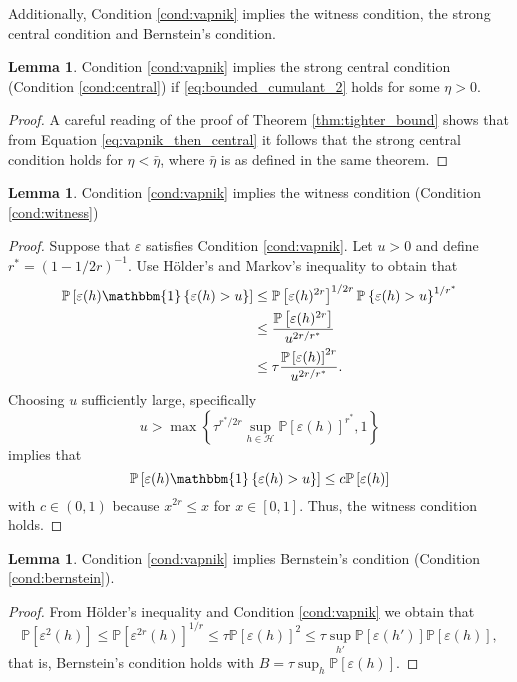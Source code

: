 \documentclass{uvamath}
\newcommand*{\calH}{\mathcal{H}}
\newcommand*{\prob}[2][]{\mathbb{P}_{#1}\left\{#2\right\}}
\newcommand*{\expv}[1]{\mathbb{P}\left[#1\right]}
\newcommand*{\indicator}[1]{\mathbbm{1}\left\{#1\right\}}
\newcommand*{\bracks}[1]{\left\{#1\right\}}
\theoremstyle{remark}
\theoremstyle{definition}
\theoremstyle{definition}
\theoremstyle{definition}
\theoremstyle{definition}
\newtheorem{lemma}[theorem]{Lemma}
\theoremstyle{definition}
\begin{document}
Additionally, Condition \ref{cond:vapnik} implies the witness
condition, the strong central condition and Bernstein's condition.

\begin{lemma}\label{lem:vapnik_then_central}
  Condition \ref{cond:vapnik} implies the strong central condition
  (Condition \ref{cond:central}) if \eqref{eq:bounded_cumulant_2}
  holds for some $\eta>0$.
\end{lemma}
\begin{proof}
  A careful reading of the proof of Theorem \ref{thm:tighter_bound}
  shows that from Equation \eqref{eq:vapnik_then_central} it follows
  that the strong central condition holds for $\eta<\bar{\eta}$, where
  $\bar{\eta}$ is as defined in the same theorem.
\end{proof}

\begin{lemma}\label{lem:vapnik_then_witness}
  Condition \ref{cond:vapnik} implies the witness condition (Condition
  \ref{cond:witness})
\end{lemma}
\begin{proof}
  Suppose that $\varepsilon$ satisfies Condition
  \ref{cond:vapnik}. Let $u>0$ and define $r^* = (1-1/2r)^{-1}$. Use
  Hölder's and Markov's inequality to obtain that
  \begin{align*}
    \expv{\varepsilon(h)\indicator{\varepsilon(h) > u}}
    &\leq
     \expv{\varepsilon(h)^{2r}}^{1/2r}\prob{\varepsilon(h) >
      u}^{1/r^*} \\
    &\leq \frac{\expv{\varepsilon(h)^{2r}}}{u^{2r/r^*}}\\
    &\leq \tau \frac{\expv{\varepsilon(h)}^{2r}}{u^{2r/r^*}}.
  \end{align*}
  Choosing $u$ sufficiently large, specifically
  \begin{equation*}
    u > \max\bracks{\tau^{r^*/2r}\sup_{h\in\calH}\expv{\varepsilon(h)}^{r^*}, 1}
  \end{equation*}
  implies that
  \begin{equation*}
    \expv{\varepsilon(h)\indicator{\varepsilon(h) > u}}  \leq c \expv{\varepsilon(h)}
  \end{equation*}
  with $c\in(0,1)$ because $x^{2r}\leq x$ for $x\in[0,1]$. Thus, the
  witness condition holds.
\end{proof}

\begin{lemma}\label{lem:vapnik_then_bernstein}
  Condition \ref{cond:vapnik} implies Bernstein's condition (Condition
  \ref{cond:bernstein}).
\end{lemma}
\begin{proof}
  From Hölder's inequality and Condition \ref{cond:vapnik} we obtain
  that
  \begin{equation*}
    \expv{\varepsilon^2(h)}\leq \expv{\varepsilon^{2r}(h)}^{1/r} \leq
    \tau \expv{\varepsilon(h)}^2\leq \tau
    \sup_{h'}\expv{\varepsilon(h')} \expv{\varepsilon(h)},
  \end{equation*}
  that is, Bernstein's condition holds with
  $B = \tau \sup_{h}\expv{\varepsilon(h)}$.
\end{proof}
\end{document}
